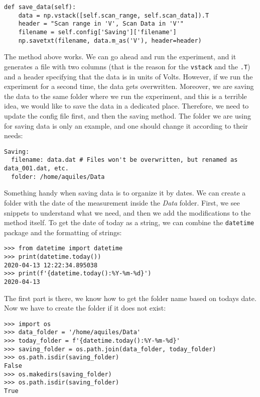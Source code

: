 \begin{verbatim}
def save_data(self):
    data = np.vstack([self.scan_range, self.scan_data]).T
    header = "Scan range in 'V', Scan Data in 'V'"
    filename = self.config['Saving']['filename']
    np.savetxt(filename, data.m_as('V'), header=header)
\end{verbatim}

The method above works. We can go ahead and run the experiment, and it generates a file with two columns (that is the reason for the \texttt{vstack} and the \texttt{.T}) and a header specifying that the data is in units of Volts. However, if we run the experiment for a second time, the data gets overwritten. Moreover, we are saving the data to the same folder where we run the experiment, and this is a terrible idea, we would like to save the data in a dedicated place. Therefore, we need to update the config file first, and then the saving method. The folder we are using for saving data is only an example, and one should change it according to their needs:

\begin{verbatim}
Saving:
  filename: data.dat # Files won't be overwritten, but renamed as data_001.dat, etc.
  folder: /home/aquiles/Data
\end{verbatim}

Something handy when saving data is to organize it by dates. We can create a folder with the date of the measurement inside the \emph{Data} folder. First, we see snippets to understand what we need, and then we add the modifications to the method itself. To get the date of today as a string, we can combine the \texttt{datetime} package and the formatting of strings:

\begin{verbatim}
>>> from datetime import datetime
>>> print(datetime.today())
2020-04-13 12:22:34.895038
>>> print(f'{datetime.today():%Y-%m-%d}')
2020-04-13
\end{verbatim}

The first part is there, we know how to get the folder name based on todays date. Now we have to create the folder if it does not exist:

\begin{verbatim}
>>> import os
>>> data_folder = '/home/aquiles/Data'
>>> today_folder = f'{datetime.today():%Y-%m-%d}'
>>> saving_folder = os.path.join(data_folder, today_folder)
>>> os.path.isdir(saving_folder)
False
>>> os.makedirs(saving_folder)
>>> os.path.isdir(saving_folder)
True
\end{verbatim}


